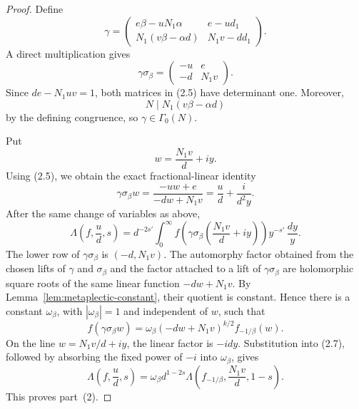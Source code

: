 \documentclass[10pt,a4paper]{amsart}
\begin{document}
\begin{proof}
Define
\[
\gamma=
\begin{pmatrix}
e\beta-uN_1\alpha&e-ud_1\\
N_1(v\beta-\alpha d)&N_1v-dd_1
\end{pmatrix}.
\]
A direct multiplication gives
\[
\gamma\sigma_\beta=
\begin{pmatrix}-u&e\\-d&N_1v\end{pmatrix}.
\tag{2.5}
\]
Since $de-N_1uv=1$, both matrices in (2.5) have determinant one. Moreover,
\[
N\mid N_1(v\beta-\alpha d)
\]
by the defining congruence, so $\gamma\in\Gamma_0(N)$.

Put
\[
w=\frac{N_1v}{d}+iy.
\]
Using (2.5), we obtain the exact fractional-linear identity
\[
\gamma\sigma_\beta w
=\frac{-u w+e}{-d w+N_1v}
=\frac ud+\frac{i}{d^2y}.
\tag{2.6}
\]
After the same change of variables as above,
\[
\Lambda\left(f,\frac ud,s\right)
=d^{-2s'}\int_0^\infty
f\left(\gamma\sigma_\beta
\left(\frac{N_1v}{d}+iy\right)\right)
y^{-s'}\,\frac{dy}{y}.
\tag{2.7}
\]
The lower row of $\gamma\sigma_\beta$ is $(-d,N_1v)$. The automorphy
factor obtained from the chosen lifts of $\gamma$ and $\sigma_\beta$ and
the factor attached to a lift of $\gamma\sigma_\beta$ are holomorphic
square roots of the same linear function $-d w+N_1v$. By
Lemma~\ref{lem:metaplectic-constant}, their quotient is constant. Hence
there is a constant $\omega_\beta$, with $|\omega_\beta|=1$ and independent
of $w$, such that
\[
f(\gamma\sigma_\beta w)
=\omega_\beta(-d w+N_1v)^{k/2}f_{-1/\beta}(w).
\]
On the line $w=N_1v/d+iy$, the linear factor is $-idy$. Substitution into
(2.7), followed by absorbing the fixed power of $-i$ into $\omega_\beta$,
gives
\[
\Lambda\left(f,\frac ud,s\right)
=\omega_\beta d^{1-2s}
\Lambda\left(f_{-1/\beta},\frac{N_1v}{d},1-s\right).
\]
This proves part~\textup{(2)}.
\end{proof}
\end{document}
